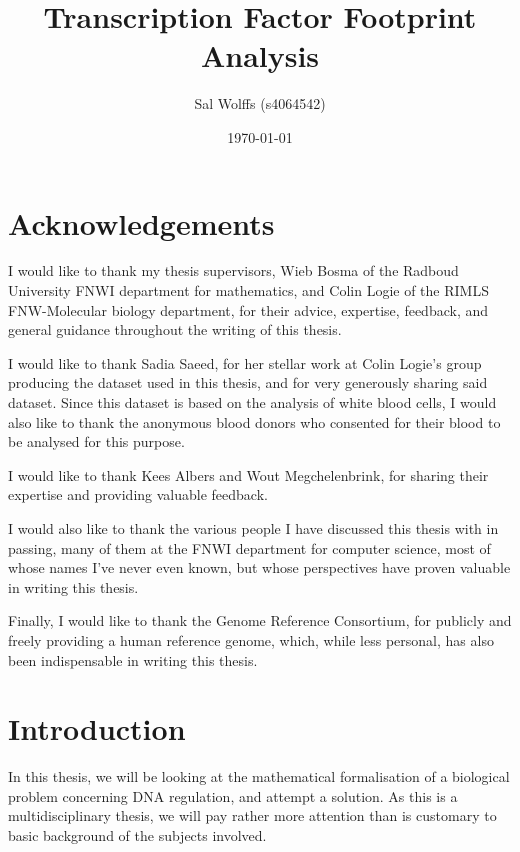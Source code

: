 \documentclass[fleqn]{book}
\title{Transcription Factor Footprint Analysis}
\author{Sal Wolffs (s4064542)}
\date{\today}
\begin{document}
\maketitle

{
\setcounter{tocdepth}{2}
\tableofcontents
}
\newcommand{\nA}{\text A}
\newcommand{\nC}{\text C}
\newcommand{\nT}{\text T}
\newcommand{\nG}{\text G}

\newcommand{\Sequences}{\text{Sequences}}
\newcommand{\Locations}{\text{Locations}}
\newcommand{\lookup}{\operatorname{lookup}}
\newcommand{\Wildcard}{\text{Wildcard}}
\newcommand{\join}{\operatorname{join}}

\chapter{Acknowledgements}\label{acknowledgements}

I would like to thank my thesis supervisors, Wieb Bosma of the Radboud
University FNWI department for mathematics, and Colin Logie of the RIMLS
FNW-Molecular biology department, for their advice, expertise, feedback,
and general guidance throughout the writing of this thesis.

I would like to thank Sadia Saeed, for her stellar work at Colin Logie's
group producing the dataset used in this thesis, and for very generously
sharing said dataset. Since this dataset is based on the analysis of
white blood cells, I would also like to thank the anonymous blood donors
who consented for their blood to be analysed for this purpose.

I would like to thank Kees Albers and Wout Megchelenbrink, for sharing
their expertise and providing valuable feedback.

I would also like to thank the various people I have discussed this
thesis with in passing, many of them at the FNWI department for computer
science, most of whose names I've never even known, but whose
perspectives have proven valuable in writing this thesis.

Finally, I would like to thank the Genome Reference Consortium, for
publicly and freely providing a human reference genome, which, while
less personal, has also been indispensable in writing this thesis.

\chapter{Introduction}\label{introduction}

In this thesis, we will be looking at the mathematical formalisation of
a biological problem concerning DNA regulation, and attempt a solution.
As this is a multidisciplinary thesis, we will pay rather more attention
than is customary to basic background of the subjects involved.
\end{document}
